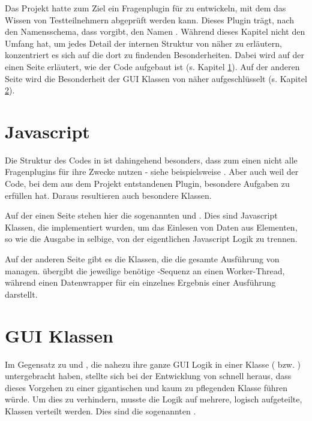 Das  Projekt hatte zum Ziel ein Fragenplugin für  zu entwickeln, mit dem das  Wissen von Testteilnehmern abgeprüft werden kann. Dieses Plugin trägt, nach den Namensschema, dass  vorgibt, den Namen . 
Während dieses Kapitel nicht den Umfang hat, um jedes Detail der internen Struktur von  näher zu erläutern, konzentriert es sich auf die dort zu findenden Besonderheiten. Dabei wird auf der einen Seite erläutert, wie der  Code aufgebaut ist (s. Kapitel \ref{sec:javascript}). Auf der anderen Seite wird die Besonderheit der GUI Klassen von  näher aufgeschlüsselt (s. Kapitel \ref{sec:gui-klassen}).

\section{Javascript}
\label{sec:javascript}

Die Struktur des  Codes in  ist dahingehend besonders, dass zum einen nicht alle  Fragenplugins  für ihre Zwecke nutzen - siehe beispielsweise . Aber auch weil der  Code, bei dem aus dem  Projekt entstandenen Plugin, besondere Aufgaben zu erfüllen hat. Daraus resultieren auch besondere Klassen.

Auf der einen Seite stehen hier die sogenannten  und . Dies sind Javascript Klassen, die implementiert wurden, um das Einlesen von Daten aus  Elementen, so wie die Ausgabe in selbige, von der eigentlichen Javascript Logik zu trennen. 

Auf der anderen Seite gibt es die Klassen, die die gesamte Ausführung von  managen.  übergibt die jeweilige benötige -Sequenz an einen  Worker-Thread, während  einen Datenwrapper für ein einzelnes Ergebnis einer Ausführung darstellt.

\section{GUI Klassen}
\label{sec:gui-klassen}

Im Gegensatz zu  und , die nahezu ihre ganze GUI Logik in einer Klasse ( bzw. )  untergebracht haben, stellte sich bei der Entwicklung von  schnell heraus, dass dieses Vorgehen zu einer gigantischen und kaum zu pflegenden Klasse führen würde. Um dies zu verhindern, musste die Logik auf mehrere, logisch aufgeteilte, Klassen verteilt werden. Dies sind die sogenannten . 

